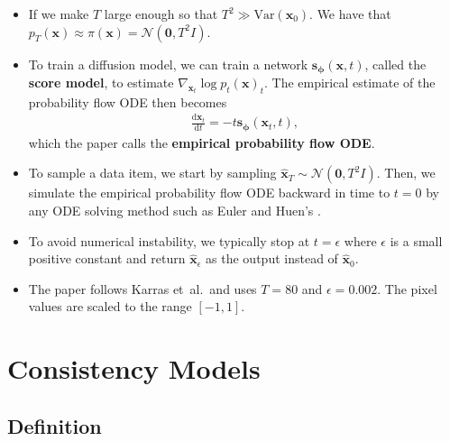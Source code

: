 \documentclass[10pt]{article}
\newcommand{\dee}{\mathrm{d}}
\newcommand{\Var}{\mathrm{Var}}
\newcommand{\ve}[1]{\mathbf{#1}}
\newcommand{\ves}[1]{\boldsymbol{#1}}
\newcommand{\etal}{{et~al.}}
\newcommand{\mcal}[1]{\mathcal{#1}}
\begin{document}
\begin{itemize}
  \item If we make $T$ large enough so that $T^2 \gg \Var(\ve{x}_0)$. We have that $p_T(\ve{x}) \approx \pi(\ve{x}) = \mcal{N}(\ve{0}, T^2I)$.
  
  \item To train a diffusion model, we can train a network $\ve{s}_{\ves{\phi}}(\ve{x},t)$, called the {\bf score model}, to estimate $\nabla_{\ve{x}_t} \log p_t(\ve{x})_t$. The empirical estimate of the probability flow ODE then becomes
  \begin{align}
    \frac{\dee \ve{x}_t}{\dee t} = - t \ve{s}_{\ves{\phi}}(\ve{x}_t, t), \label{eqn:empirical-probability-flow-ode}
  \end{align}
  which the paper calls the {\bf empirical probability flow ODE}.

  \item To sample a data item, we start by sampling $\hat{\ve{x}}_T \sim \mcal{N}(\ve{0}, T^2I)$. Then, we simulate the empirical probability flow ODE backward in time to $t = 0$ by any ODE solving method such as Euler \cite{Song:2021} and Huen's \cite{Karras:2022}.

  \item To avoid numerical instability, we typically stop at $t = \epsilon$ where $\epsilon$ is a small positive constant and return $\hat{\ve{x}}_{\epsilon}$ as the output instead of $\hat{\ve{x}}_0$.
  
  \item The paper follows Karras \etal\ and uses $T = 80$ and $\epsilon = 0.002$. The pixel values are scaled to the range $[-1,1]$.
\end{itemize}

\section{Consistency Models}

\subsection{Definition}
\end{document}
